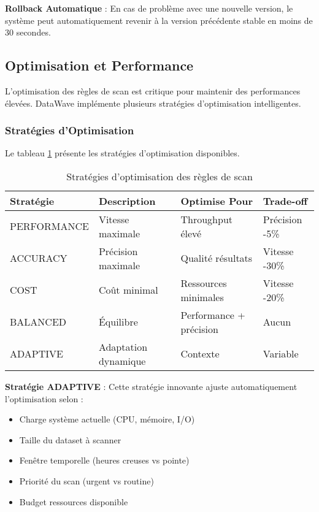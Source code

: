 \textbf{Rollback Automatique} : En cas de problème avec une nouvelle version, le système peut automatiquement revenir à la version précédente stable en moins de 30 secondes.

\subsection{Optimisation et Performance}

L'optimisation des règles de scan est critique pour maintenir des performances élevées. DataWave implémente plusieurs stratégies d'optimisation intelligentes.

\subsubsection{Stratégies d'Optimisation}

Le tableau \ref{tab:strategies_optimisation} présente les stratégies d'optimisation disponibles.

\begin{table}[htpb]
\centering
\caption{Stratégies d'optimisation des règles de scan}
\label{tab:strategies_optimisation}
\begin{tabular}{|p{}|p{}|p{}|p{}|}
\hline
\textbf{Stratégie} & \textbf{Description} & \textbf{Optimise Pour} & \textbf{Trade-off} \\
\hline
PERFORMANCE & Vitesse maximale & Throughput élevé & Précision -5\% \\
\hline
ACCURACY & Précision maximale & Qualité résultats & Vitesse -30\% \\
\hline
COST & Coût minimal & Ressources minimales & Vitesse -20\% \\
\hline
BALANCED & Équilibre & Performance + précision & Aucun \\
\hline
ADAPTIVE & Adaptation dynamique & Contexte & Variable \\
\hline
\end{tabular}
\end{table}

\textbf{Stratégie ADAPTIVE} : Cette stratégie innovante ajuste automatiquement l'optimisation selon :
\begin{itemize}
    \item Charge système actuelle (CPU, mémoire, I/O)
    \item Taille du dataset à scanner
    \item Fenêtre temporelle (heures creuses vs pointe)
    \item Priorité du scan (urgent vs routine)
    \item Budget ressources disponible
\end{itemize}

